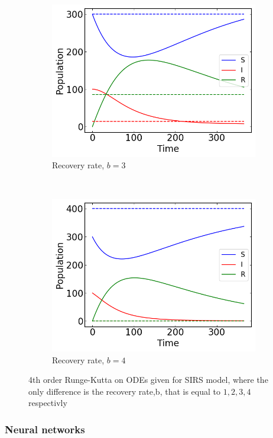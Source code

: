 \begin{figure}[H]
\begin{subfigure}{0.49\textwidth}
         \includegraphics[width=\linewidth]{../fig/texfig/RK4_b3T1.png}
         \caption{Recovery rate, $b = 3$}
    \end{subfigure}
     ~ 
    \begin{subfigure}{0.49\textwidth}
         \centering
         \includegraphics[width=\linewidth]{../fig/texfig/RK4_b4T1.png}
         \caption{Recovery rate, $b = 4$}
    \end{subfigure}
    \caption{4th order Runge-Kutta on ODEs given for SIRS model, where the only difference is the recovery rate,b, that is equal to $1,2,3,4$ respectivly}
    \label{fig:4RKSIRS}
\end{figure}

\subsubsection{Neural networks}

